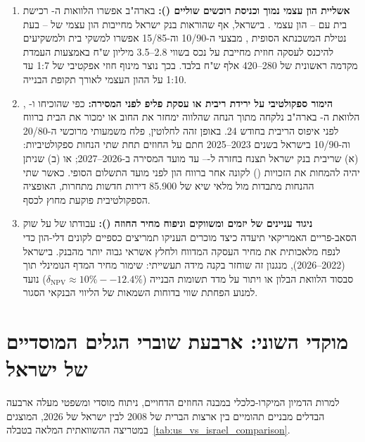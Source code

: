 \begin{enumerate}[label=\textbf{\arabic*.},rightmargin=0.6cm]
  \item \textbf{אשליית הון עצמי נמוך וכניסת רוכשים שוליים ():} בארה"ב אפשרו הלוואות ה- רכישת בית עם -- הון עצמי \cite{mayer2009rise}. בישראל, אף שהוראות בנק ישראל מחייבות הון עצמי של -- בעת נטילת המשכנתא הסופית \cite{boi2025stability}, מבצעי ה-\num{10/90} וה-\num{15/85} אפשרו למשקי בית ולמשקיעים להיכנס לעסקה חוזית מחייבת על נכס בשווי \num{2.8}--\num{3.5} מיליון ש"ח באמצעות העמדת מקדמה ראשונית של \num{280}--\num{420} אלף ש"ח בלבד. בכך נוצר מינוף חוזי אפקטיבי של \num{1:7} עד \num{1:10} על ההון העצמי לאורך תקופת הבנייה.
  \item \textbf{הימור ספקולטיבי על ירידת ריבית או עסקת פליפ לפני המסירה:} כפי שהוכיחו  \cite{gorton2009securitized} ו- \cite{mayer2009rise}, הלוואת ה- בארה"ב נלקחה מתוך הנחה שהלווה ימחזר את החוב או ימכור את הבית ברווח לפני איפוס הריבית בחודש \num{24}. באופן זהה לחלוטין, פלח משמעותי מרוכשי ה-\num{20/80} וה-\num{10/90} בישראל בשנים \num{2023}--\num{2025} חתם על החוזים תחת שתי הנחות ספקולטיביות: (א) שריבית בנק ישראל תצנח בחזרה ל--- עד מועד המסירה ב-\num{2026}--\num{2027}; או (ב) שניתן יהיה להמחות את הזכויות () לקונה אחר ברווח הון לפני מועד התשלום הסופי. כאשר שתי ההנחות מתבדות מול מלאי שיא של \num{85,900} דירות חדשות מתחרות, האופציה הספקולטיבית פוקעת מחוץ לכסף.
  \item \textbf{ניגוד עניינים של יזמים ומשווקים וניפוח מחיר החוזה ():} עבודתו של  \cite{ben2011inflated} על שוק הסאב-פריים האמריקאי תיעדה כיצד מוכרים העניקו תמריצים כספיים לקונים דלי-הון כדי לנפח מלאכותית את מחיר העסקה המדווח ולחלץ אשראי גבוה יותר מהבנק. בישראל (\num{2022}--\num{2026}), מנגנון זה שוחזר בקנה מידה תעשייתי: שימור מחיר המדף הנומינלי תוך סבסוד הלוואת הבלון או ויתור על מדד תשומות הבנייה ($\delta_{\text{NPV}} \approx 10\%--12.4\%$) נועד למנוע הפחתת שווי בדוחות השמאות של הליווי הבנקאי הסגור.
\end{enumerate}

\section{מוקדי השוני: ארבעת שוברי הגלים המוסדיים של ישראל}
\label{sec:differences_shields}

למרות הדמיון המיקרו-כלכלי במבנה החוזים הדחויים, ניתוח מוסדי ומשפטי מעלה ארבעה הבדלים מבניים תהומיים בין ארצות הברית של \num{2008} לבין ישראל של \num{2026}, המוצגים במטריצה ההשוואתית המלאה בטבלה~\ref{tab:us_vs_israel_comparison}.

